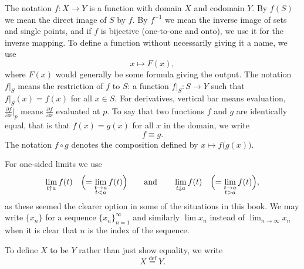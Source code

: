 \documentclass[12pt,openany]{book}
\newcommand{\glsadd}[2][]{}
\theoremstyle{plain}
\theoremstyle{remark}
\theoremstyle{definition}
\theoremstyle{exercise}
\theoremstyle{example}
\begin{document}
\glsadd{not:function}%
The notation $f \colon X \to Y$ is a function with domain $X$ and
codomain $Y$.  By $f(S)$ we mean the direct image of $S$ by $f$.
By $f^{-1}$ we mean the inverse image of sets and
single points, and if $f$ is bijective (one-to-one and onto),
we use it for the inverse mapping.
To define a function without necessarily giving it a name, we use
\glsadd{not:mapsto}%
\begin{equation*}
x \mapsto F(x) ,
\end{equation*}
where $F(x)$ would generally be some formula giving the output.
The notation
\glsadd{not:restriction}%
$f|_S$
means the restriction of $f$ to $S$:
a function
$f|_S \colon S \to Y$ such that $f|_S(x) = f(x)$ for all $x \in S$.
For derivatives, vertical bar means evaluation,
$\frac{\partial f}{\partial x}\big|_p$ means 
$\frac{\partial f}{\partial x}$ evaluated at $p$.
To say that two functions $f$ and $g$ are identically equal,
that is that $f(x) = g(x)$ for all $x$ in the domain,
we write
\glsadd{not:identeq}%
\begin{equation*}
f \equiv g .
\end{equation*}
The notation
\glsadd{not:composition}%
$f \circ g$
denotes the composition defined by $x \mapsto f\bigl(g(x)\bigr)$.

For one-sided limits we use
\glsadd{not:limupfunc}%
\glsadd{not:limdownfunc}%
\begin{equation*}
\lim_{t \uparrow a} f(t) \quad \Bigl( = \lim_{\substack{t \to a\\t < a}} f(t)
\Bigr)
\qquad \text{and} \qquad
\lim_{t \downarrow a} f(t) \quad \Bigl( = \lim_{\substack{t \to a\\t > a}} f(t)
\Bigr) ,
\end{equation*}
as these seemed the clearer option in some of the situations in this book.
We may write $\{ x_n \}$ for a sequence $\{x_n\}_{n=1}^\infty$ and similarly
$\lim x_n$ instead of $\lim_{n\to \infty} x_n$ when it is clear that $n$ is
the index of the sequence.

To define $X$ to be $Y$ rather than just show equality, we write
\glsadd{not:definition}%
\begin{equation*}
X
\overset{\text{def}}{=}
Y .
\end{equation*}

\end{document}
